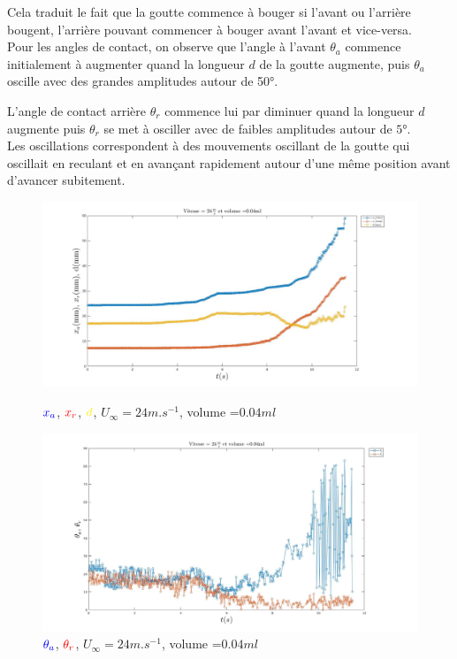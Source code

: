 \documentclass[french]{article}
\begin{document}
Cela traduit le fait que la goutte commence à bouger si l'avant ou l'arrière bougent, l'arrière pouvant commencer à bouger avant l'avant et vice-versa.\\

Pour les angles de contact, on observe que l'angle à l'avant $\theta_{a}$ commence initialement à augmenter quand la longueur $d$ de la goutte augmente, puis $\theta_{a}$ oscille avec des grandes amplitudes autour de \ang{50}.

L'angle de contact arrière $\theta_{r}$ commence lui par diminuer quand la longueur $d$ augmente puis $\theta_{r}$ se met à osciller avec de faibles amplitudes autour de $\ang{5}$.\\

Les oscillations correspondent à des mouvements oscillant de la goutte qui oscillait en reculant et en avançant rapidement autour d'une même position avant d'avancer subitement.

\newpage
\begin{figure}[!ht]
	\centering
	\begin{minipage}{0.7\linewidth}
		\includegraphics[width=\linewidth]{./image/v=24_vol=004_xaxrd.jpg}
		\caption{$\textcolor{blue}{x_{a}}$,
		$\textcolor{red}{x_{r}}$, $\textcolor{yellow}{d}$, 
		$U_{\infty}=24m.s^{-1}$, volume =$0.04ml$}
		\label{fig:entre_xaxrd}
	\end{minipage}
	\vfill
	\begin{minipage}{0.7\linewidth}
		\includegraphics[width=\linewidth]{./image/v=24_vol=004_oaor.jpg}
		\caption{$\textcolor{blue}{\theta_{a}}$,
		$\textcolor{red}{\theta_{r}}$, $U_{\infty}=24m.s^{-1}$, volume =$0.04ml$}
		\label{fig:entre_oaor}
	\end{minipage}
 \end{figure}
\end{document}
